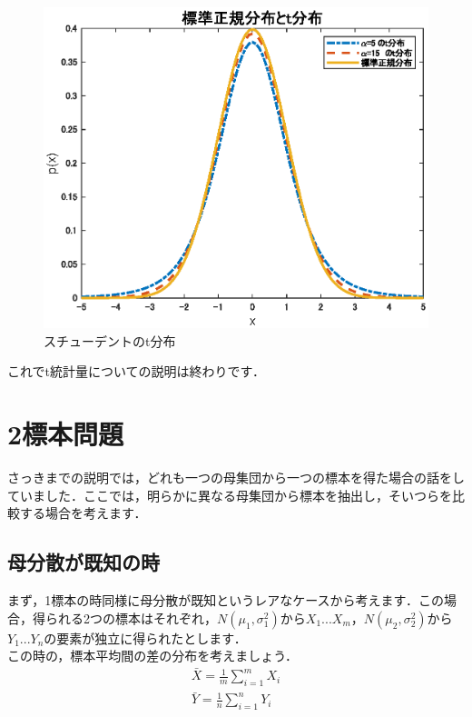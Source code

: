 \documentclass[11pt,a4paper,uplatex]{ujreport} 	%
\begin{document}
\begin{figure}[H]
  \centering
  \includegraphics{../figures/student.eps}
  \caption{スチューデントのt分布}
\end{figure}

これでt統計量についての説明は終わりです．


\section{2標本問題}
さっきまでの説明では，どれも一つの母集団から一つの標本を得た場合の話をしていました．ここでは，明らかに異なる母集団から標本を抽出し，そいつらを比較する場合を考えます．

\subsection{母分散が既知の時}
まず，1標本の時同様に母分散が既知というレアなケースから考えます．この場合，得られる2つの標本はそれぞれ，$N(\mu_1, \sigma_1^2)$から$X_1...X_m$，$N(\mu_2, \sigma_2^2)$から$Y_1...Y_n$の要素が独立に得られたとします．\\

この時の，標本平均間の差の分布を考えましょう．\\

\begin{align}
  \bar{X} = \frac{1}{m}\sum_{i=1}^m X_i\\
  \bar{Y} = \frac{1}{n}\sum_{i=1}^n Y_i
\end{align}
\end{document}
